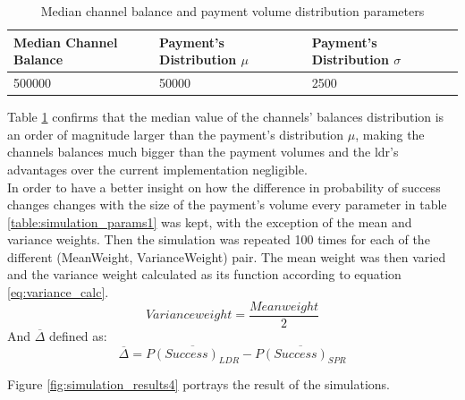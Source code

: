 \begin{table}[H]
\begin{tabular}{|l|l|l|}
\hline
\rowcolor[HTML]{C0C0C0} 
{\color[HTML]{000000} Median Channel Balance} & {\color[HTML]{000000} Payment's Distribution $\mu$} & {\color[HTML]{000000} Payment's Distribution $\sigma$} \\ \hline
500000                                        & 50000                    & 2500                     \\ \hline
\end{tabular}
\caption{Median channel balance and payment volume distribution parameters}
\label{table:simulation_channel_info1}
\end{table}

Table \ref{table:simulation_channel_info1} confirms that the median value of the channels' balances distribution is an order of magnitude larger than the payment's distribution $\mu$, making the channels balances much bigger than the payment volumes and the \acrshort{ldr}'s advantages over the current implementation negligible. \\

In order to have a better insight on how the difference in probability of success changes changes with the size of the payment's volume every parameter in table \ref{table:simulation_params1} was kept, with the exception of the mean and variance weights. Then the simulation was repeated 100 times for each of the different (MeanWeight, VarianceWeight) pair.
The mean weight was then varied and the variance weight calculated as its function according to equation \ref{eq:variance_calc}.
\begin{equation}
    Variance weight = \frac{Mean weight}{2}
    \label{eq:variance_calc}
\end{equation}
And $\overline{\Delta}$ defined as:
\begin{equation}
    \overline{\Delta} = \overline{P(Success)_{LDR}} - \overline{P(Success)_{SPR}}
\end{equation}

Figure \ref{fig:simulation_results4} portrays the result of the simulations.

